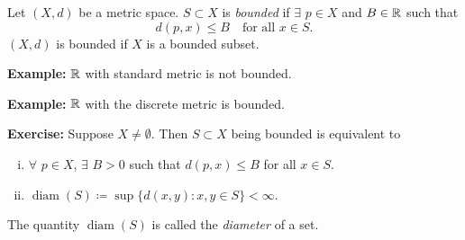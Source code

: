 \documentclass[10pt,aspectratio=169]{beamer}
\begin{document}
\begin{frame}

\begin{definition}
Let $(X,d)$ be a metric space.  $S \subset X$ is 
\emph{bounded} if $\exists$ $p \in X$ and
$B \in {\mathbb{R}}$ such that
\begin{equation*}
d(p,x) \leq B \quad \text{for all } x \in S.
\end{equation*}
\pause
$(X,d)$ is bounded if $X$ is a bounded subset.
\end{definition}

\pause
\textbf{Example:}
${\mathbb{R}}$ with standard metric is not bounded.

\pause
\medskip

\textbf{Example:}
${\mathbb{R}}$ with the discrete metric is bounded.

\pause
\medskip

\textbf{Exercise:}
Suppose $X \not= \emptyset$.
Then $S \subset X$ being bounded is equivalent to
\begin{enumerate}[(i)]
\item
\pause
$\forall$ $p \in X$, $\exists$ $B > 0$ such that $d(p,x) \leq B$ for
all $x \in S$.
\item
\pause
$\operatorname{diam}(S) \coloneqq \sup \bigl\{ d(x,y) : x,y \in S \bigr\} < \infty$.
\end{enumerate}

\pause
The quantity $\operatorname{diam}(S)$ is called the
\emph{diameter} of a set.

\end{frame}

%
%
%
%
\end{document}
